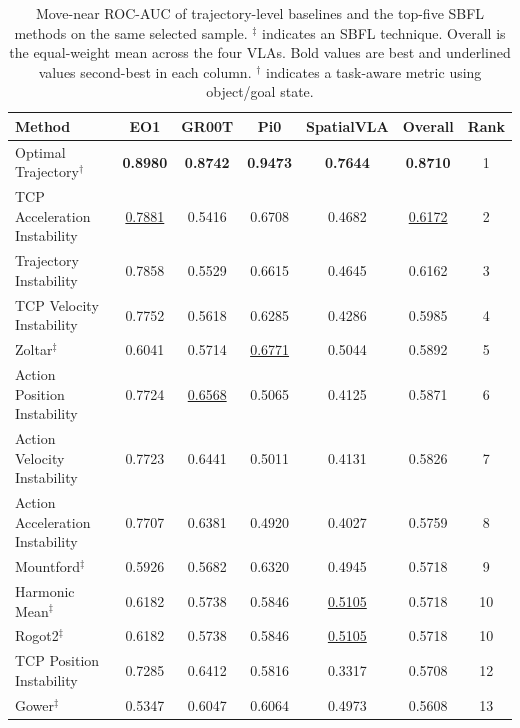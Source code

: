 \begin{table}[t]
\centering
\caption{Move-near ROC-AUC of trajectory-level baselines and the top-five SBFL methods on the same selected sample. $^{\ddagger}$ indicates an SBFL technique. Overall is the equal-weight mean across the four VLAs. Bold values are best and underlined values second-best in each column. $^{\dagger}$ indicates a task-aware metric using object/goal state.}
\label{tab:rq5-baselines-top5-sbfl}
{\scriptsize
\setlength{\tabcolsep}{4pt}
\begin{tabular}{lcccccc}
\toprule
Method & EO1 & GR00T & Pi0 & SpatialVLA & Overall & Rank \\
\midrule
Optimal Trajectory$^{\dagger}$ & \textbf{0.8980} & \textbf{0.8742} & \textbf{0.9473} & \textbf{0.7644} & \textbf{0.8710} & 1 \\
TCP Acceleration Instability & \underline{0.7881} & 0.5416 & 0.6708 & 0.4682 & \underline{0.6172} & 2 \\
Trajectory Instability & 0.7858 & 0.5529 & 0.6615 & 0.4645 & 0.6162 & 3 \\
TCP Velocity Instability & 0.7752 & 0.5618 & 0.6285 & 0.4286 & 0.5985 & 4 \\
Zoltar$^{\ddagger}$ & 0.6041 & 0.5714 & \underline{0.6771} & 0.5044 & 0.5892 & 5 \\
Action Position Instability & 0.7724 & \underline{0.6568} & 0.5065 & 0.4125 & 0.5871 & 6 \\
Action Velocity Instability & 0.7723 & 0.6441 & 0.5011 & 0.4131 & 0.5826 & 7 \\
Action Acceleration Instability & 0.7707 & 0.6381 & 0.4920 & 0.4027 & 0.5759 & 8 \\
Mountford$^{\ddagger}$ & 0.5926 & 0.5682 & 0.6320 & 0.4945 & 0.5718 & 9 \\
Harmonic Mean$^{\ddagger}$ & 0.6182 & 0.5738 & 0.5846 & \underline{0.5105} & 0.5718 & 10 \\
Rogot2$^{\ddagger}$ & 0.6182 & 0.5738 & 0.5846 & \underline{0.5105} & 0.5718 & 10 \\
TCP Position Instability & 0.7285 & 0.6412 & 0.5816 & 0.3317 & 0.5708 & 12 \\
Gower$^{\ddagger}$ & 0.5347 & 0.6047 & 0.6064 & 0.4973 & 0.5608 & 13 \\
\bottomrule
\end{tabular}
}
\end{table}
